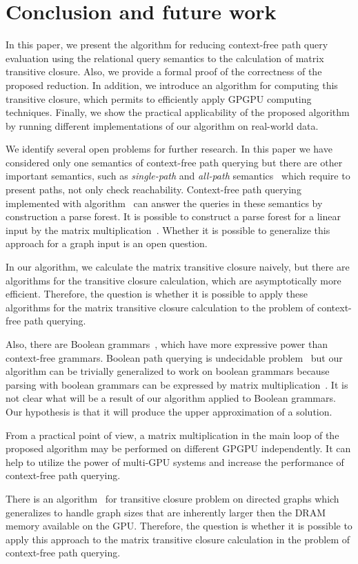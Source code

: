 \section{Conclusion and future work}
In this paper, we present the algorithm for reducing context-free path query evaluation using the relational query semantics to the calculation of matrix transitive closure. Also, we provide a formal proof of the correctness of the proposed reduction. In addition, we introduce an algorithm for computing this transitive closure, which permits to efficiently apply GPGPU computing techniques. Finally, we show the practical applicability of the proposed algorithm by running different implementations of our algorithm on real-world data.

We identify several open problems for further research. In this paper we have considered only one semantics of context-free path querying but there are other important semantics, such as \textit{single-path} and \textit{all-path} semantics~\cite{hellingsPathQuerying} which require to present paths, not only check reachability. Context-free path querying implemented with algorithm~\cite{GLL} can answer the queries in these semantics by construction a parse forest. It is possible to construct a parse forest for a linear input by the matrix multiplication~\cite{okhotin_cyk}. Whether it is possible to generalize this approach for a graph input is an open question.

In our algorithm, we calculate the matrix transitive closure naively, but there are algorithms for the transitive closure calculation, which are asymptotically more efficient. Therefore, the question is whether it is possible to apply these algorithms for the matrix transitive closure calculation to the problem of context-free path querying.

Also, there are Boolean grammars~\cite{okhotinBoolean}, which have more expressive power than context-free grammars. Boolean path querying is undecidable problem~\cite{hellingsRelational} but our algorithm can be trivially generalized to work on boolean grammars because parsing with boolean grammars can be expressed by matrix multiplication~\cite{okhotin_cyk}. It is not clear what will be a result of our algorithm applied to Boolean grammars. Our hypothesis is that it will produce the upper approximation of a solution.

From a practical point of view, a matrix multiplication in the main loop of the proposed algorithm may be performed on different GPGPU independently. It can help to utilize the power of multi-GPU systems and increase the performance of context-free path querying.

There is an algorithm~\cite{apspGPU} for transitive closure problem on directed graphs which generalizes to handle graph sizes that are inherently larger then the DRAM memory available on the GPU. Therefore, the question is whether it is possible to apply this approach to the matrix transitive closure calculation in the problem of context-free path querying.